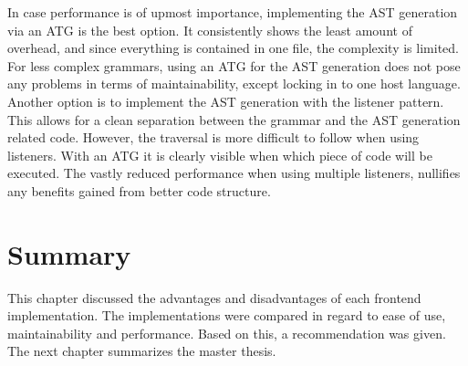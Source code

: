 In case performance is of upmost importance, implementing the AST generation via an ATG is the best option. It consistently shows the least amount of overhead, and since everything is contained in one file, the complexity is limited. For less complex grammars, using an ATG for the AST generation does not pose any problems in terms of maintainability, except locking in to one host language. Another option is to implement the AST generation with the listener pattern. This allows for a clean separation between the grammar and the AST generation related code. However, the traversal is more difficult to follow when using listeners. With an ATG it is clearly visible when which piece of code will be executed. The vastly reduced performance when using multiple listeners, nullifies any benefits gained from better code structure.

\section{Summary}

This chapter discussed the advantages and disadvantages of each frontend implementation. The implementations were compared in regard to ease of use, maintainability and performance. Based on this, a recommendation was given. The next chapter summarizes the master thesis.
